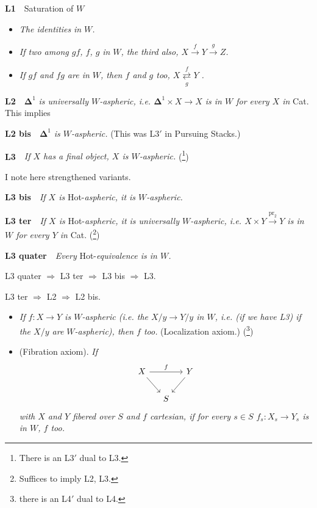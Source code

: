 \noindent\textbf{L1}\ \ Saturation of $W$

\begin{itemize}[leftmargin=2.5em]
\item[a)] \textit{The identities} \textit{in $W$.}
\item[b)] \textit{If two among $gf$, $f$, $g$} \textit{in $W$, the third also, $X \xrightarrow{f} Y \xrightarrow{g} Z$.}
\item[c)] \textit{If $gf$ and $fg$ are in $W$, then $f$ and $g$ too, $X \overset{f}{\underset{g}{\rightleftarrows}} Y$ .}
\end{itemize}

\noindent\textbf{L2}\ \ $\mathbf{\Delta}^1$ \textit{is universally $W$-aspheric, i.e. $\mathbf{\Delta}^1 \times X \longrightarrow X$ is in $W$ for every $X$ in} Cat. This implies

\noindent\textbf{L2 bis}\ \ $\mathbf{\Delta}^1$ \textit{is $W$-aspheric.} (This was L3$'$ in Pursuing Stacks.)

\noindent\textbf{L3}\ \ \textit{If $X$ has a final object, $X$ is $W$-aspheric.} (\footnote[1]{There is an L3$'$ dual to L3.})

\noindent I note here strengthened variants.

\noindent\textbf{L3 bis}\ \ \textit{If $X$ is} Hot-\textit{aspheric, it is $W$-aspheric.}

\noindent\textbf{L3 ter}\ \ \textit{If $X$ is} Hot-\textit{aspheric, it is universally $W$-aspheric, i.e. $X \times Y \xrightarrow{\mathrm{pr}_2} Y$ is in $W$ for every $Y$ in} Cat. (\footnote[2]{Suffices to imply L2, L3.})

\clearpage

\noindent{}
\textbf{L3 quater}\ \ \textit{Every} Hot-\textit{equivalence is in $W$.}

\noindent L3 quater $\Longrightarrow$ L3 ter $\Longrightarrow$ L3 bis $\Longrightarrow$ L3.

\noindent L3 ter $\Longrightarrow$ L2 $\Longrightarrow$ L2 bis.

\noindent{}

\begin{itemize}[leftmargin=2.5em]
\item[\textbf{L4}] \textit{If $f : X \longrightarrow Y$ is $W$-aspheric (i.e. the $X/y \longrightarrow Y/y$ in $W$, i.e. (if we have L3) if the $X/y$ are $W$-aspheric), then $f$ too.} (Localization axiom.) (\footnote[3]{there is an L4$'$ dual to L4.}) 

\item[\textbf{L5}] (Fibration axiom). \textit{If}
\[
\begin{tikzcd}[column sep=small]
X \arrow[rr, "f"] \arrow[dr] & & Y \arrow[dl] \\
& S &
\end{tikzcd}
\]
\textit{with $X$ and $Y$ fibered over $S$ and $f$ cartesian, if for every $s \in S$ $f_s : X_s \longrightarrow Y_s$ is in $W$, $f$ too.}
\end{itemize}

